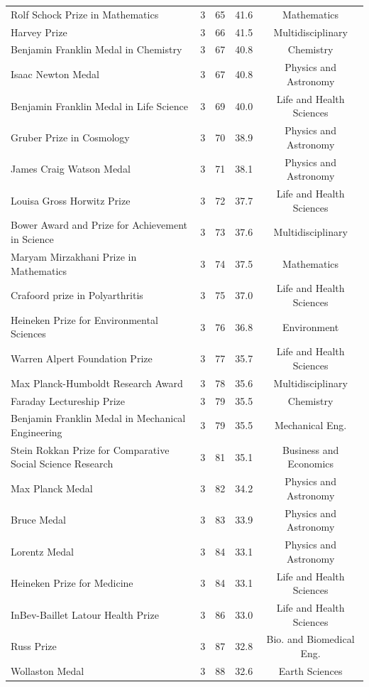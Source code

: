 \begin{longtable}{>{\raggedright\arraybackslash}p{7.2cm}cccc}
Rolf Schock Prize in Mathematics & 3 & 65 & 41.6 & Mathematics \\ 
Harvey Prize & 3 & 66 & 41.5 & Multidisciplinary \\ 
Benjamin Franklin Medal in Chemistry & 3 & 67 & 40.8 & Chemistry \\ 
Isaac Newton Medal & 3 & 67 & 40.8 & Physics and Astronomy \\ 
Benjamin Franklin Medal in Life Science & 3 & 69 & 40.0 & Life and Health Sciences \\ 
Gruber Prize in Cosmology & 3 & 70 & 38.9 & Physics and Astronomy \\ 
James Craig Watson Medal & 3 & 71 & 38.1 & Physics and Astronomy \\ 
Louisa Gross Horwitz Prize & 3 & 72 & 37.7 & Life and Health Sciences \\ 
Bower Award and Prize for Achievement in Science & 3 & 73 & 37.6 & Multidisciplinary \\ 
Maryam Mirzakhani Prize in Mathematics & 3 & 74 & 37.5 & Mathematics \\ 
Crafoord prize in Polyarthritis & 3 & 75 & 37.0 & Life and Health Sciences \\ 
Heineken Prize for Environmental Sciences & 3 & 76 & 36.8 & Environment \\ 
Warren Alpert Foundation Prize & 3 & 77 & 35.7 & Life and Health Sciences \\ 
Max Planck-Humboldt Research Award & 3 & 78 & 35.6 & Multidisciplinary \\ 
Faraday Lectureship Prize & 3 & 79 & 35.5 & Chemistry \\ 
Benjamin Franklin Medal in Mechanical Engineering & 3 & 79 & 35.5 & Mechanical Eng. \\ 
Stein Rokkan Prize for Comparative Social Science Research & 3 & 81 & 35.1 & Business and Economics \\ 
Max Planck Medal & 3 & 82 & 34.2 & Physics and Astronomy \\ 
Bruce Medal & 3 & 83 & 33.9 & Physics and Astronomy \\ 
Lorentz Medal & 3 & 84 & 33.1 & Physics and Astronomy \\ 
Heineken Prize for Medicine & 3 & 84 & 33.1 & Life and Health Sciences \\ 
InBev-Baillet Latour Health Prize & 3 & 86 & 33.0 & Life and Health Sciences \\ 
Russ Prize & 3 & 87 & 32.8 & Bio. and Biomedical Eng. \\ 
Wollaston Medal & 3 & 88 & 32.6 & Earth Sciences \\ 

\end{longtable}
